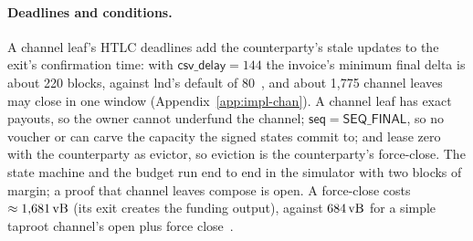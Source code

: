 \paragraph{Deadlines and conditions.} A channel leaf's HTLC deadlines add the counterparty's stale updates to the exit's confirmation time: with $\mathsf{csv\_delay} = 144$ the invoice's minimum final delta is about 220 blocks, against lnd's default of 80~\cite{lnd}, and about 1{,}775 channel leaves may close in one window (Appendix~\ref{app:impl-chan}). A channel leaf has exact payouts, so the owner
cannot underfund the channel; $\mathsf{seq} = \mathsf{SEQ\_FINAL}$, so no
voucher or  can carve the capacity the signed states commit
to; and lease zero with the counterparty as evictor, so eviction is the
counterparty's force-close. The state machine and the budget run end to
end in the simulator with two blocks of margin; a proof
that channel leaves compose is open. A force-close costs
$\approx 1{,}681\,\mathrm{vB}$ (its exit creates the funding output), against
$684\,\mathrm{vB}$ for a simple taproot channel's open plus force close~\cite{taprootchans}.
